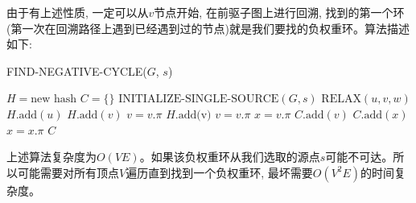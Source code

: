 \documentclass[paper=a4, fontsize=11pt]{scrartcl} %
\numberwithin{equation}{section} %
\numberwithin{figure}{section} %
\numberwithin{table}{section} %
\begin{document}
由于有上述性质, 一定可以从$v$节点开始, 在前驱子图上进行回溯, 找到的第一个环(第一次在回溯路径上遇到已经遇到过的节点)就是我们要找的负权重环。算法描述如下:

\begin{algorithm}[H]
  \caption{FIND-NEGATIVE-CYCLE($G$, $s$)}
  \label{algo:1}
  \begin{algorithmic}
    \State $H = \mbox{new hash}$
    \State $C = \{\}$
    \State $\mbox{INITIALIZE-SINGLE-SOURCE}(G, s)$
    \State $\mbox{RELAX}(u, v, w)$
    \EndFor
    \EndFor
    \State $H.\mbox{add}(u)$
    \State $H.\mbox{add}(v)$
    \State $v = v.\pi$
    \State $H.\mbox{add(v)}$
    \State $v = v.\pi$
    \EndWhile
    \State $x = v.\pi$
    \State $C.\mbox{add}(v)$
    \State $C.\mbox{add}(x)$
    \State $x = x.\pi$
    \EndWhile
    \EndIf
    \EndFor
    \State\Return $C$
  \end{algorithmic}
\end{algorithm}

上述算法复杂度为$O(V E)$。如果该负权重环从我们选取的源点$s$可能不可达。所以可能需要对所有顶点$V$遍历直到找到一个负权重环, 最坏需要$O(V^2 E)$的时间复杂度。
\end{document}
